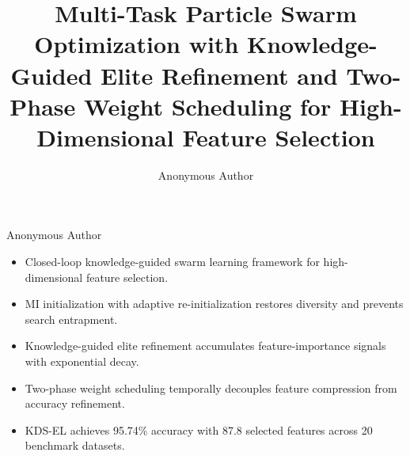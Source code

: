\documentclass[a4paper,fleqn]{cas-dc}
\begin{document}
\par
\vspace{1em}
\par
\vspace{0.5em}
\noindent Anonymous Author\par
\vspace{1.5em}

\begin{itemize}\setlength{\itemsep}{8pt}
  \item Closed-loop knowledge-guided swarm learning framework for high-dimensional feature selection.
  \item MI initialization with adaptive re-initialization restores diversity and prevents search entrapment.
  \item Knowledge-guided elite refinement accumulates feature-importance signals with exponential decay.
  \item Two-phase weight scheduling temporally decouples feature compression from accuracy refinement.
  \item KDS-EL achieves 95.74\% accuracy with 87.8 selected features across 20 benchmark datasets.
\end{itemize}

\clearpage


\title[mode=title]{Multi-Task Particle Swarm Optimization with Knowledge-Guided Elite Refinement and Two-Phase Weight Scheduling for High-Dimensional Feature Selection}

\author[1]{Anonymous Author}
\cormark[1]
\address[1]{School of Computer Science, Anonymous University, Anonymous City, China}
\end{document}
